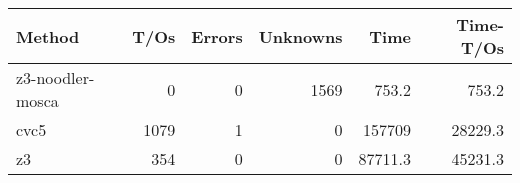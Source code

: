 \begin{tabular}{lrrrrr}
\hline
 Method           &   T/Os &   Errors &   Unknowns &     Time &   Time-T/Os \\
\hline
 z3-noodler-mosca &      0 &        0 &       1569 &    753.2 &       753.2 \\
 cvc5             &   1079 &        1 &          0 & 157709   &     28229.3 \\
 z3               &    354 &        0 &          0 &  87711.3 &     45231.3 \\
\hline
\end{tabular}
